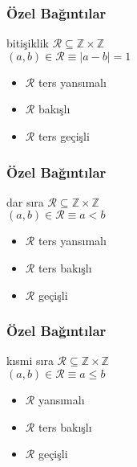 \documentclass[dvipsnames]{beamer}
\theoremstyle{definition}
\theoremstyle{example}
\theoremstyle{plain}
\begin{document}
\begin{frame}
  \frametitle{Özel Bağıntılar}

  \begin{block}{bitişiklik}
    $\mathcal{R} \subseteq \mathbb{Z} \times \mathbb{Z}$\\
    $(a,b) \in \mathcal{R} \equiv |a-b|=1$

    \medskip
    \begin{itemize}
      \item $\mathcal{R}$ ters yansımalı
      \item $\mathcal{R}$ bakışlı
      \item $\mathcal{R}$ ters geçişli
    \end{itemize}
  \end{block}
\end{frame}

\begin{frame}
  \frametitle{Özel Bağıntılar}

  \begin{block}{dar sıra}
    $\mathcal{R} \subseteq \mathbb{Z} \times \mathbb{Z}$\\
    $(a,b) \in \mathcal{R} \equiv a<b$

    \medskip
    \begin{itemize}
      \item $\mathcal{R}$ ters yansımalı
      \item $\mathcal{R}$ ters bakışlı
      \item $\mathcal{R}$ geçişli
    \end{itemize}
  \end{block}
\end{frame}

\begin{frame}
  \frametitle{Özel Bağıntılar}

  \begin{block}{kısmi sıra}
    $\mathcal{R} \subseteq \mathbb{Z} \times \mathbb{Z}$\\
    $(a,b) \in \mathcal{R} \equiv a \leq b$

    \medskip
    \begin{itemize}
      \item $\mathcal{R}$ yansımalı
      \item $\mathcal{R}$ ters bakışlı
      \item $\mathcal{R}$ geçişli
    \end{itemize}
  \end{block}
\end{frame}
\end{document}

